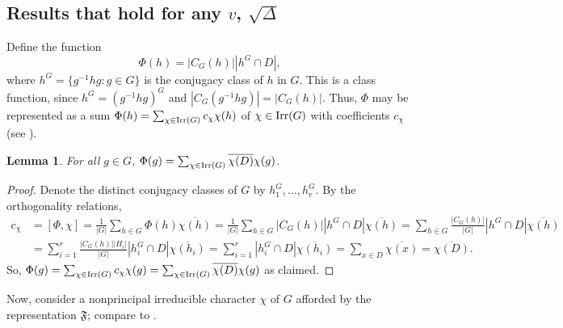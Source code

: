 \documentclass[12pt]{amsproc} %
\newtheorem{lem}[thm]{Lemma}
\theoremstyle{definition}\newtheorem{defn}[thm]{Definition}
\theoremstyle{definition}\newtheorem{rem}[thm]{Remark}
\theoremstyle{definition}\newtheorem{ex}[thm]{Example}
\newcommand{\Irr}{{\rm Irr}}
\newcommand{\repF}{\mathfrak{F}}
\begin{document}
\subsection{Results that hold for any $v$, $\sqrt{\Delta}$}
\label{subsec:ott1}

Define the function \[\Phi(h) = |C_G(h)||h^G\cap D|,\] where $h^G = \{g^{-1}hg:g\in G\}$ is the conjugacy class of $h$ in $G$. This is a class function, since $h^G = (g^{-1}hg)^G$ and $|C_G(g^{-1}hg)| = |C_G(h)|$. Thus, $\Phi$ may be represented as a sum $\Phi(h) = \sum_{\chi\in\Irr(G)}c_\chi\chi(h)$ of $\chi\in\Irr(G)$ with coefficients $c_\chi$ (see \cite[Section 1]{ott}).

\begin{lem}\label{phi-function}
	For all $g \in G$,  $\Phi(g) = \sum_{\chi\in\Irr(G)} \overline{\chi(D)} \chi(g)$.
\end{lem}
	\begin{proof}
	Denote the distinct conjugacy classes of $G$ by $h_1^G, \dots, h_r^G$. By the orthogonality relations, 
		\begin{align*}
			c_\chi &= [\Phi,\chi] = \frac1{|G|}\sum_{h\in G}\Phi(h)\overline{\chi(h)} = \frac1{|G|}\sum_{h\in G}|C_G(h)||h^G\cap D|\overline{\chi(h)} = \sum_{h\in G}\frac{|C_G(h)|}{|G|}|h^G\cap D|\overline{\chi(h)}\\
			       &= \sum_{i=1}^r\frac{|C_G(h)||H_i|}{|G|}|h_i^G\cap D|\overline{\chi(h_i)} = \sum_{i=1}^r |h_i^G\cap D|\overline{\chi(h_i)} = \sum_{x \in D}\overline{\chi(x)} = \overline{\chi(D)}.
		\end{align*}
	So, $\Phi(g) = \sum_{\chi\in\Irr(G)} c_\chi \chi(g) = \sum_{\chi\in\Irr(G)} \overline{\chi(D)} \chi(g)$ as claimed.
	\end{proof}


Now, consider a nonprincipal irreducible character $\chi$ of $G$ afforded by the representation $\repF$; compare to \cite[Lemma 2.2]{ott}.
\end{document}
